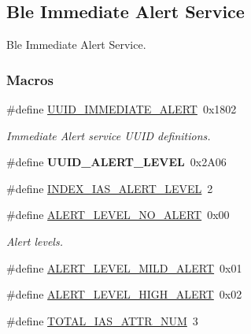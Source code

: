 \hypertarget{group___b_l_e___i_a_s}{}\subsection{Ble Immediate Alert Service}
\label{group___b_l_e___i_a_s}


Ble Immediate Alert Service.  


\subsubsection*{Macros}
\begin{DoxyCompactItemize}
\item 
\#define \hyperlink{group___b_l_e___i_a_s_ga91fba028b571e3ba5df3e6f3f25a7609}{U\+U\+I\+D\+\_\+\+I\+M\+M\+E\+D\+I\+A\+T\+E\+\_\+\+A\+L\+E\+RT}~0x1802\hypertarget{group___b_l_e___i_a_s_ga91fba028b571e3ba5df3e6f3f25a7609}{}\label{group___b_l_e___i_a_s_ga91fba028b571e3ba5df3e6f3f25a7609}

\begin{DoxyCompactList}\small\item\em Immediate Alert service U\+U\+ID definitions. \end{DoxyCompactList}\item 
\#define {\bfseries U\+U\+I\+D\+\_\+\+A\+L\+E\+R\+T\+\_\+\+L\+E\+V\+EL}~0x2\+A06\hypertarget{group___b_l_e___i_a_s_ga1bbf6424686c00ceecb1a7bf7f5cbef3}{}\label{group___b_l_e___i_a_s_ga1bbf6424686c00ceecb1a7bf7f5cbef3}

\item 
\#define \hyperlink{group___b_l_e___i_a_s_gae6e70d5da3c2994dd908c9c2be3710a3}{I\+N\+D\+E\+X\+\_\+\+I\+A\+S\+\_\+\+A\+L\+E\+R\+T\+\_\+\+L\+E\+V\+EL}~2
\item 
\#define \hyperlink{group___b_l_e___i_a_s_ga2b9c170b858bc7776ffda41d20a57b12}{A\+L\+E\+R\+T\+\_\+\+L\+E\+V\+E\+L\+\_\+\+N\+O\+\_\+\+A\+L\+E\+RT}~0x00
\begin{DoxyCompactList}\small\item\em Alert levels. \end{DoxyCompactList}\item 
\#define \hyperlink{group___b_l_e___i_a_s_gad54bc05bfbd668d20c97f740e5cad14c}{A\+L\+E\+R\+T\+\_\+\+L\+E\+V\+E\+L\+\_\+\+M\+I\+L\+D\+\_\+\+A\+L\+E\+RT}~0x01
\item 
\#define \hyperlink{group___b_l_e___i_a_s_gaa6d896950cabe95f73e332ff71bb4ab0}{A\+L\+E\+R\+T\+\_\+\+L\+E\+V\+E\+L\+\_\+\+H\+I\+G\+H\+\_\+\+A\+L\+E\+RT}~0x02
\item 
\#define \hyperlink{group___b_l_e___i_a_s_ga7120f8471084d8937f559b1df420044a}{T\+O\+T\+A\+L\+\_\+\+I\+A\+S\+\_\+\+A\+T\+T\+R\+\_\+\+N\+UM}~3
\end{DoxyCompactItemize}
